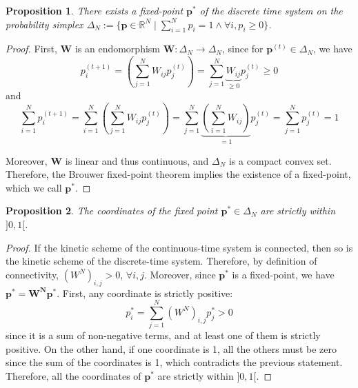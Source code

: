 \documentclass{article}
\newtheorem{proposition}{Proposition}
\theoremstyle{remark}
\begin{document}
    \begin{proposition}
        There exists a fixed-point $\mathbf{p}^*$ of the discrete time system on the probability simplex $\Delta_N := \{\mathbf{p}\in\mathbb{R}^N \mid \sum_{i=1}^N p_i = 1 \wedge \forall i, p_i\geq 0\}$.
    \end{proposition}

    \begin{proof}
        First, $\mathbf{W}$ is an endomorphism $\mathbf{W}: \Delta_N \to \Delta_N$, since for $\mathbf{p}^{(t)}\in \Delta_N$, we have
        \begin{equation}
            p_i^{(t+1)} 
            = \left(\sum_{j=1}^N W_{ij}p_j^{(t)}\right) 
            = \sum_{j=1}^N \underbrace{W_{ij}}_{\geq 0}  p_j^{(t)} 
            \geq 0
        \end{equation}
        and
        \begin{equation}
            \sum_{i=1}^N p_i^{(t+1)} 
            = \sum_{i=1}^N \left(\sum_{j=1}^N W_{ij}p_j^{(t)}\right) 
            = \sum_{j=1}^N \underbrace{\left(\sum_{i=1}^N W_{ij}\right)}_{=1}  p_j^{(t)} 
            = \sum_{j=1}^N p_j^{(t)} 
            = 1
        \end{equation}
    
        Moreover, $\mathbf{W}$ is linear and thus continuous, and $\Delta_N$ is a compact convex set. Therefore, the Brouwer fixed-point theorem implies the existence of a fixed-point, which we call $\mathbf{p}^*$.
    \end{proof}

    \begin{proposition}
    \label{prop:coordinates}
        The coordinates of the fixed point $\mathbf{p}^*\in \Delta_N$ are strictly within $]0, 1[$.
    \end{proposition}

    \begin{proof}
        If the kinetic scheme of the continuous-time system is connected, then so is the kinetic scheme of the discrete-time system. Therefore, by definition of connectivity, $(W^N)_{i,j}>0$, $\forall i,j$. Moreover, since $\mathbf{p}^*$ is a fixed-point, we have $\mathbf{p}^* = \mathbf{W^N}\mathbf{p}^*$. First, any coordinate is strictly positive:
        \begin{equation}
            p_i^* = \sum_{j=1}^N (W^N)_{i,j}p_j^* > 0 
        \end{equation}
        since it is a sum of non-negative terms, and at least one of them is strictly positive. On the other hand, if one coordinate is 1, all the others must be zero since the sum of the coordinates is 1, which contradicts the previous statement. Therefore, all the coordinates of $\mathbf{p}^*$ are strictly within $]0, 1[$.
    \end{proof}
\end{document}
